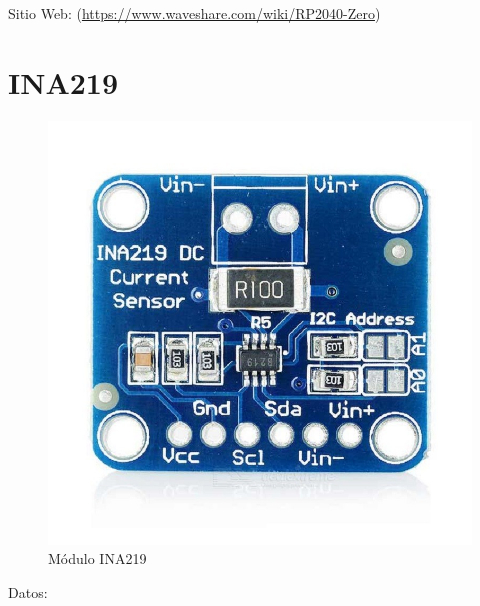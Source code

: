                 Sitio Web: (\href{https://www.waveshare.com/wiki/RP2040-Zero}{https://www.waveshare.com/wiki/RP2040-Zero})\par
        
        \newpage
        
        \section{INA219}
        \label{ina219}
                \begin{figure}[!ht]
                    \centering
                    \includegraphics[width=0.7\linewidth]{Anexo_C/INA219.png}
                    \caption{Módulo INA219}
                    \label{fig:c2}
                \end{figure}
            
                Datos:\par
            
